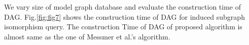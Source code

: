 We vary size of model graph database and evaluate the construction time of DAG.
Fig.\ref{fig:fig7} shows the construction time of DAG for induced subgraph isomorphism query.
The construction Time of DAG of proposed algorithm is almost same as the one of Messmer et al.'s algorithm.





